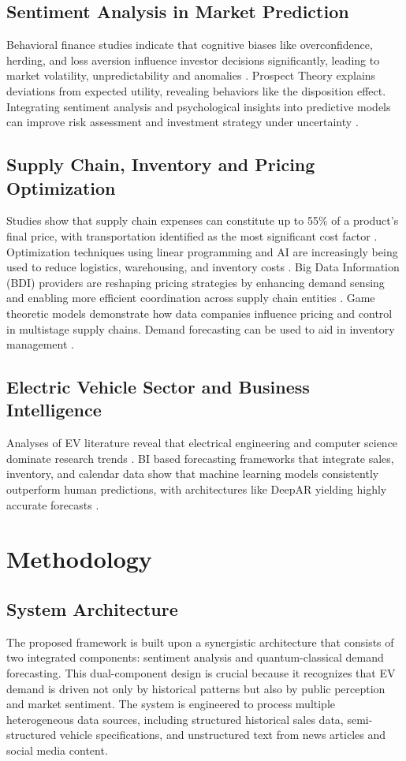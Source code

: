 \documentclass[pdflatex,sn-mathphys-num]{sn-jnl}%
\begin{document}
\subsection{Sentiment Analysis in Market Prediction}
Behavioral finance studies indicate that cognitive biases like overconfidence, herding, and loss aversion influence investor decisions significantly, leading to market volatility, unpredictability and anomalies \cite{bib12}. Prospect Theory explains deviations from expected utility, revealing behaviors like the disposition effect. Integrating sentiment analysis and psychological insights into predictive models can improve risk assessment and investment strategy under uncertainty \cite{bib13}.
\subsection{Supply Chain, Inventory and Pricing Optimization}
Studies show that supply chain expenses can constitute up to 55\% of a product’s final price, with transportation identified as the most significant cost factor \cite{bib14}. Optimization techniques using linear programming and AI are increasingly being used to reduce logistics, warehousing, and inventory costs \cite{bib15}. Big Data Information (BDI) providers are reshaping pricing strategies by enhancing demand sensing and enabling more efficient coordination across supply chain entities \cite{bib16}. Game theoretic models demonstrate how data companies influence pricing and control in multistage supply chains. Demand forecasting can be used to aid in inventory management \cite{bib17}.
\subsection{Electric Vehicle Sector and Business Intelligence}
Analyses of EV literature reveal that electrical engineering and computer science dominate research trends \cite{bib18}. BI based forecasting frameworks that integrate sales, inventory, and calendar data show that machine learning models consistently outperform human predictions, with architectures like DeepAR yielding highly accurate forecasts \cite{bib19}.

\section{Methodology}\label{sec3}
\subsection{System Architecture}
The proposed framework is built upon a synergistic architecture that consists of two integrated components: sentiment analysis and quantum-classical demand forecasting. This dual-component design is crucial because it recognizes that EV demand is driven not only by historical patterns but also by public perception and market sentiment. The system is engineered to process multiple heterogeneous data sources, including structured historical sales data, semi-structured vehicle specifications, and unstructured text from news articles and social media content.
\end{document}

